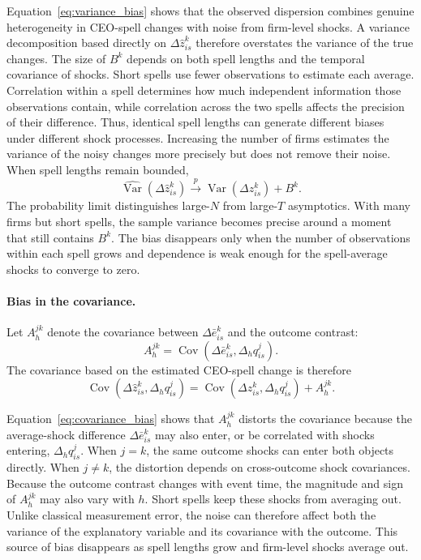\documentclass[sigconf,nonacm]{acmart}
\begin{document}
Equation~\eqref{eq:variance_bias} shows that the observed dispersion combines genuine heterogeneity in CEO-spell changes with noise from firm-level shocks. A variance decomposition based directly on $\Delta\widehat z_{is}^{k}$ therefore overstates the variance of the true changes. The size of $B^k$ depends on both spell lengths and the temporal covariance of shocks. Short spells use fewer observations to estimate each average. Correlation within a spell determines how much independent information those observations contain, while correlation across the two spells affects the precision of their difference. Thus, identical spell lengths can generate different biases under different shock processes. Increasing the number of firms estimates the variance of the noisy changes more precisely but does not remove their noise. When spell lengths remain bounded,
\begin{equation}
\widehat{\operatorname{Var}}\!\left(
\Delta\widehat z_{is}^{k}
\right)
\overset{p}{\longrightarrow}
\operatorname{Var}\!\left(
\Delta z_{is}^{k}
\right)
+
B^{k}.
\label{eq:variance_plim}
\end{equation}
The probability limit distinguishes large-$N$ from large-$T$ asymptotics. With many firms but short spells, the sample variance becomes precise around a moment that still contains $B^k$. The bias disappears only when the number of observations within each spell grows and dependence is weak enough for the spell-average shocks to converge to zero.
\vspace{.2cm}

\paragraph{Bias in the covariance.} Let $A_h^{jk}$ denote the covariance between $\Delta\bar e_{is}^{k}$ and the outcome contrast:
\begin{equation}
A_h^{jk}
=
\operatorname{Cov}\!\left(
\Delta\bar e_{is}^{k},
\Delta_h q_{is}^{j}
\right).
\label{eq:A_definition}
\end{equation}
The covariance based on the estimated CEO-spell change is therefore
\begin{equation}
\operatorname{Cov}\!\left(
\Delta\widehat z_{is}^{k},
\Delta_h q_{is}^{j}
\right)
=
\operatorname{Cov}\!\left(
\Delta z_{is}^{k},
\Delta_h q_{is}^{j}
\right)
+
A_h^{jk}.
\label{eq:covariance_bias}
\end{equation}

Equation~\eqref{eq:covariance_bias} shows that $A_h^{jk}$ distorts the covariance because the average-shock difference $\Delta\bar e_{is}^{k}$ may also enter, or be correlated with shocks entering, $\Delta_h q_{is}^{j}$. When $j=k$, the same outcome shocks can enter both objects directly. When $j\neq k$, the distortion depends on cross-outcome shock covariances. Because the outcome contrast changes with event time, the magnitude and sign of $A_h^{jk}$ may also vary with $h$. Short spells keep these shocks from averaging out. Unlike classical measurement error, the noise can therefore affect both the variance of the explanatory variable and its covariance with the outcome. This source of bias disappears as spell lengths grow and firm-level shocks average out.
\end{document}

